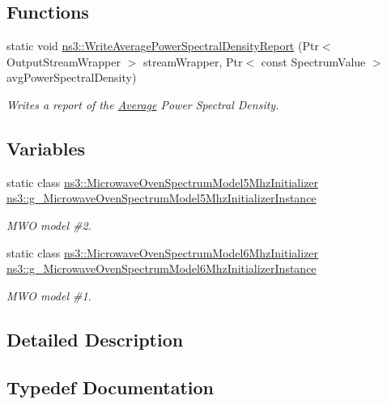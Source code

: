 \subsection*{Functions}
\begin{DoxyCompactItemize}
\item 
static void \hyperlink{group__spectrum_ga0f83c7e6ef0082eec9df1e99ffba29b7}{ns3\+::\+Write\+Average\+Power\+Spectral\+Density\+Report} (Ptr$<$ Output\+Stream\+Wrapper $>$ stream\+Wrapper, Ptr$<$ const Spectrum\+Value $>$ avg\+Power\+Spectral\+Density)
\begin{DoxyCompactList}\small\item\em Writes a report of the \hyperlink{classns3_1_1Average}{Average} Power Spectral Density. \end{DoxyCompactList}\end{DoxyCompactItemize}
\subsection*{Variables}
\begin{DoxyCompactItemize}
\item 
static class \hyperlink{classns3_1_1MicrowaveOvenSpectrumModel5MhzInitializer}{ns3\+::\+Microwave\+Oven\+Spectrum\+Model5\+Mhz\+Initializer} \hyperlink{group__spectrum_ga5073cbf9e00712117f2d24d81740a34c}{ns3\+::g\+\_\+\+Microwave\+Oven\+Spectrum\+Model5\+Mhz\+Initializer\+Instance}
\begin{DoxyCompactList}\small\item\em M\+WO model \#2. \end{DoxyCompactList}\item 
static class \hyperlink{classns3_1_1MicrowaveOvenSpectrumModel6MhzInitializer}{ns3\+::\+Microwave\+Oven\+Spectrum\+Model6\+Mhz\+Initializer} \hyperlink{group__spectrum_gaca1a04ae288bb360e6c5974c1161dd08}{ns3\+::g\+\_\+\+Microwave\+Oven\+Spectrum\+Model6\+Mhz\+Initializer\+Instance}
\begin{DoxyCompactList}\small\item\em M\+WO model \#1. \end{DoxyCompactList}\end{DoxyCompactItemize}


\subsection{Detailed Description}


\subsection{Typedef Documentation}
